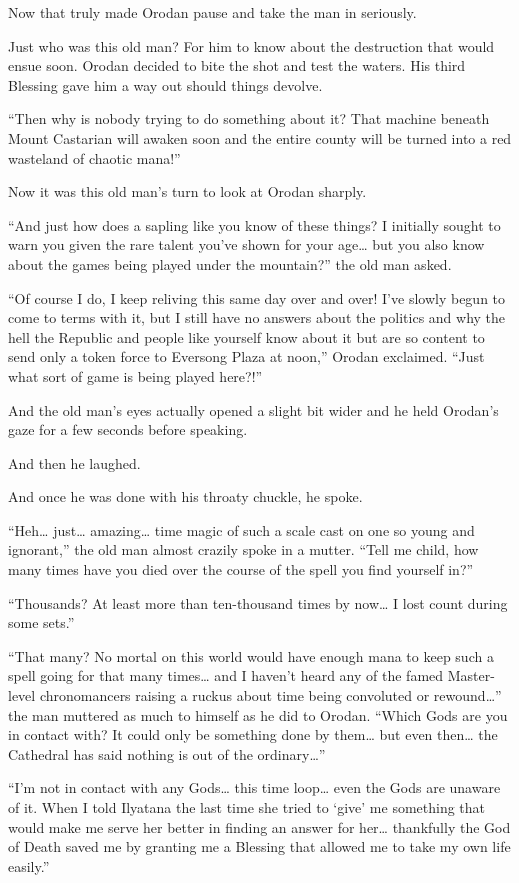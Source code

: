 \documentclass[a4paper,10pt]{book}
\begin{document}
Now that truly made Orodan pause and take the man in seriously.\par
Just who was this old man? For him to know about the destruction that would ensue soon. Orodan decided to bite the shot and test the waters. His third Blessing gave him a way out should things devolve.\par
“Then why is nobody trying to do something about it? That machine beneath Mount Castarian will awaken soon and the entire county will be turned into a red wasteland of chaotic mana!”\par
Now it was this old man’s turn to look at Orodan sharply.\par
“And just how does a sapling like you know of these things? I initially sought to warn you given the rare talent you’ve shown for your age… but you also know about the games being played under the mountain?” the old man asked.\par
“Of course I do, I keep reliving this same day over and over! I’ve slowly begun to come to terms with it, but I still have no answers about the politics and why the hell the Republic and people like yourself know about it but are so content to send only a token force to Eversong Plaza at noon,” Orodan exclaimed. “Just what sort of game is being played here?!”\par
And the old man’s eyes actually opened a slight bit wider and he held Orodan’s gaze for a few seconds before speaking.\par
And then he laughed.\par
And once he was done with his throaty chuckle, he spoke.\par
“Heh… just… amazing… time magic of such a scale cast on one so young and ignorant,” the old man almost crazily spoke in a mutter. “Tell me child, how many times have you died over the course of the spell you find yourself in?”\par
“Thousands? At least more than ten-thousand times by now… I lost count during some sets.”\par
“That many? No mortal on this world would have enough mana to keep such a spell going for that many times… and I haven’t heard any of the famed Master-level chronomancers raising a ruckus about time being convoluted or rewound…” the man muttered as much to himself as he did to Orodan. “Which Gods are you in contact with? It could only be something done by them… but even then… the Cathedral has said nothing is out of the ordinary…”\par
“I’m not in contact with any Gods… this time loop… even the Gods are unaware of it. When I told Ilyatana the last time she tried to ‘give’ me something that would make me serve her better in finding an answer for her… thankfully the God of Death saved me by granting me a Blessing that allowed me to take my own life easily.”\par
\end{document}
